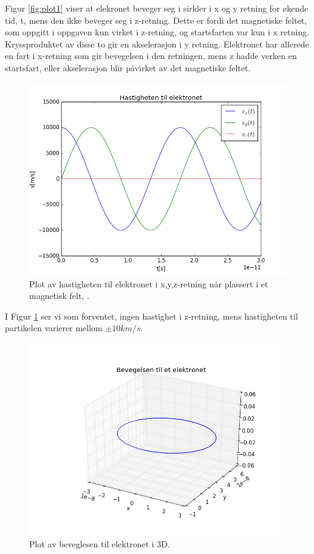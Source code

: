\documentclass[a4paper,norsk,12pt]{article}
\begin{document}
Figur \ref{fig:plot1} viser at elekronet beveger seg i sirkler i x og y retning for økende tid, t, mens den ikke beveger seg i z-retning. Dette er fordi det magnetiske feltet, som oppgitt i oppgaven kun virket i z-retning, og startsfarten var kun i x retning. Kryssproduktet av disse to gir en akselerasjon i y retning. Elektronet har allerede en fart i x-retning som gir bevegelsen i den retningen, mens z hadde verken en startsfart, eller akselerasjon blir påvirket av det magnetiske feltet. 


\begin{figure}[H]
  \includegraphics[width=\linewidth]{oppgave22.png}
  \caption{Plot av hastigheten til elektronet i x,y,z-retning når plassert i et magnetisk felt, .}
  \label{fig:plot2}
\end{figure}

I Figur \ref{fig:plot2} ser vi som forventet, ingen hastighet i z-retning, mens hastigheten til partikelen varierer mellom $ \pm 10km/s$. 


\begin{figure}[H]
  \includegraphics[width=\linewidth]{oppgave23.png}
  \caption{Plot av beveglesen til elektronet i 3D.}
  \label{fig:plot3}
\end{figure}
\end{document}
